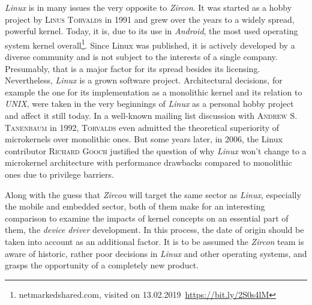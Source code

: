 \textit{Linux} is in many issues the very opposite to \textit{Zircon}.
It was started as a hobby project by \textsc{Linus Torvalds} in 1991 and grew over the years to a widely spread, powerful kernel.
Today, it is, due to its use in \textit{Android}, the most used operating system kernel overall\footnote{netmarkedshared.com, visited on 13.02.2019~\url{https://bit.ly/2S0s4lM}}. 
Since Linux was published, it is actively developed by a diverse community and is not subject to the interests of a single company. 
Presumably, that is a major factor for its spread besides its licensing.
Nevertheless, \textit{Linux} is a grown software project.
Architectural decisions, for example the one for its implementation as a monolithic kernel and its relation to \textit{UNIX}, were taken in the very beginnings of \textit{Linux} as a personal hobby project and affect it still today.
In a well-known mailing list discussion with \textsc{Andrew S. Tanenbaum} in 1992, \textsc{Torvalds} even admitted the theoretical superiority of microkernels over monolithic ones\cite{linux-is-obsolete}.
But some years later, in 2006, the Linux contributor \textsc{Richard Gooch} justified the question of why \textit{Linux} won't change to a microkernel architecture with performance drawbacks compared to monolithic ones due to privilege barriers\cite{why-linux-monolith}.

Along with the guess that \textit{Zircon} will target the same sector as \textit{Linux}, especially the mobile and embedded sector, both of them make for an interesting comparison to examine the impacts of kernel concepts on an essential part of them, the \textit{device driver} development.
In this process, the date of origin should be taken into account as an additional factor.
It is to be assumed the \textit{Zircon} team is aware of historic, rather poor decisions in \textit{Linux} and other operating systems, and grasps the opportunity of a completely new product.




